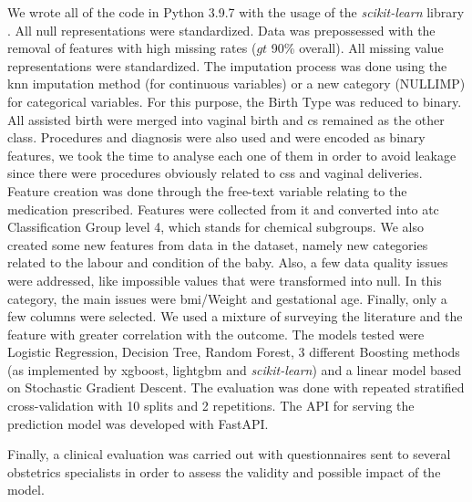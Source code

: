 We wrote all of the code in Python 3.9.7 with the usage of the \textit{scikit-learn} library \cite{scikit-learn}. All null representations were standardized. Data was prepossessed with the removal of features with high missing rates ($gt$ 90\% overall). All missing value representations were standardized. The imputation process was done using the \ac{knn} imputation method (for continuous variables) or a new category (NULLIMP) for categorical variables. 
For this purpose, the Birth Type was reduced to binary. All assisted birth were merged into vaginal birth and \ac{cs} remained as the other class. Procedures and diagnosis were also used and were encoded as binary features, we took the time to analyse each one of them in order to avoid leakage since there were procedures obviously related to \acp{cs} and vaginal deliveries.
Feature creation was done through the free-text variable relating to the medication prescribed. Features were collected from it and converted into \ac{atc} Classification Group level 4, which stands for chemical subgroups. We also created some new features from data in the dataset, namely new categories related to the labour and condition of the baby.
Also, a few data quality issues were addressed, like impossible values that were transformed into null. In this category, the main issues were \ac{bmi}/Weight and gestational age.
Finally, only a few columns were selected. We used a mixture of surveying the literature and the feature with greater correlation with the outcome.
The models tested were Logistic Regression, Decision Tree, Random Forest, 3 different Boosting methods (as implemented by \ac{xgboost}, \ac{lightgbm} and \textit{scikit-learn}) and a linear model based on Stochastic Gradient Descent.
The evaluation was done with repeated stratified cross-validation with 10 splits and 2 repetitions.
The API for serving the prediction model was developed with FastAPI.

Finally, a clinical evaluation was carried out with questionnaires sent to several obstetrics specialists in order to assess the validity and possible impact of the model.
